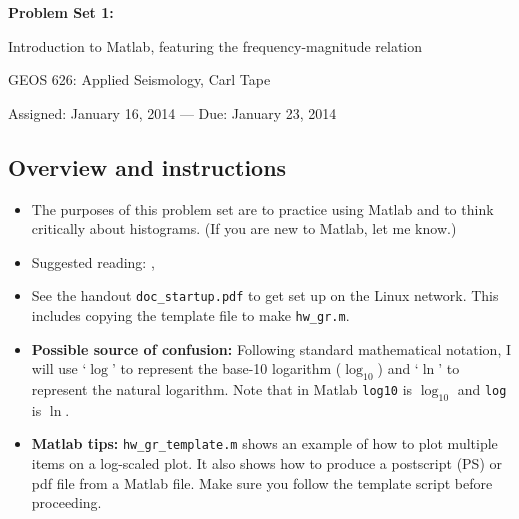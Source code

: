 \documentclass[11pt,titlepage,fleqn]{article}
\begin{document}

\begin{center}

{\large \bf Problem Set 1: 

Introduction to Matlab, featuring the frequency-magnitude relation}

GEOS 626: Applied Seismology, Carl Tape

Assigned: January 16, 2014 --- Due: January 23, 2014

\end{center}


\subsection*{Overview and instructions}

\begin{itemize}

\item The purposes of this problem set are to practice using Matlab and to think critically about histograms. (If you are new to Matlab, let me know.)

\item Suggested reading: \citet[][Section 4.7.1]{SteinWysession}, \citet{GutenbergRichter1944}

\item See the handout \verb+doc_startup.pdf+ to get set up on the Linux network. This includes copying the template file to make \verb+hw_gr.m+.

\item {\bf Possible source of confusion:} Following standard mathematical notation, I will use `$\log$' to represent the base-10 logarithm ($\log_{10}$) and `$\ln$' to represent the natural logarithm. Note that in Matlab \verb+log10+ is $\log_{10}$ and \verb+log+ is $\ln$.

\item {\bf Matlab tips:}
\verb+hw_gr_template.m+ shows an example of how to plot multiple items on a log-scaled plot. It also shows how to produce a postscript (PS) or pdf file from a Matlab file. Make sure you follow the template script before proceeding.

\end{itemize}
\end{document}
